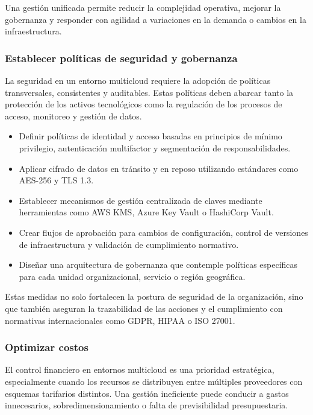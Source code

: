 {                Una gestión unificada permite reducir la complejidad operativa, mejorar la gobernanza y responder con agilidad a variaciones en la demanda o cambios en la infraestructura.
                
            \subsubsection{Establecer políticas de seguridad y gobernanza}
                La seguridad en un entorno multicloud requiere la adopción de políticas transversales, consistentes y auditables. Estas políticas deben abarcar tanto la protección de los activos tecnológicos como la regulación de los procesos de acceso, monitoreo y gestión de datos.
                
                \begin{itemize}
                    \item Definir políticas de identidad y acceso basadas en principios de mínimo privilegio, autenticación multifactor y segmentación de responsabilidades.
                    \item Aplicar cifrado de datos en tránsito y en reposo utilizando estándares como AES-256 y TLS 1.3.
                    \item Establecer mecanismos de gestión centralizada de claves mediante herramientas como AWS KMS, Azure Key Vault o HashiCorp Vault.
                    \item Crear flujos de aprobación para cambios de configuración, control de versiones de infraestructura y validación de cumplimiento normativo.
                    \item Diseñar una arquitectura de gobernanza que contemple políticas específicas para cada unidad organizacional, servicio o región geográfica.
                \end{itemize}
                
                Estas medidas no solo fortalecen la postura de seguridad de la organización, sino que también aseguran la trazabilidad de las acciones y el cumplimiento con normativas internacionales como GDPR, HIPAA o ISO 27001.
                
            \subsubsection{Optimizar costos}
                El control financiero en entornos multicloud es una prioridad estratégica, especialmente cuando los recursos se distribuyen entre múltiples proveedores con esquemas tarifarios distintos. Una gestión ineficiente puede conducir a gastos innecesarios, sobredimensionamiento o falta de previsibilidad presupuestaria.
                
}
